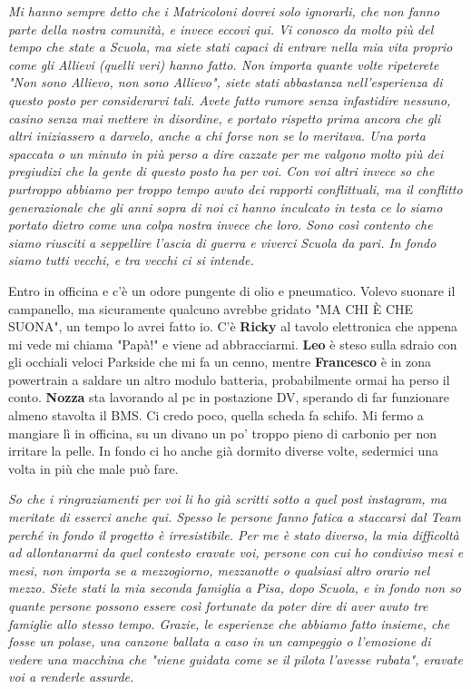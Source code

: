 \textit{Mi hanno sempre detto che i Matricoloni dovrei solo ignorarli, che non fanno parte della nostra comunità, e invece eccovi qui. Vi conosco da molto più del tempo che state a Scuola, ma siete stati capaci di entrare nella mia vita proprio come gli Allievi (quelli veri) hanno fatto. Non importa quante volte ripeterete "Non sono Allievo, non sono Allievo", siete stati abbastanza nell'esperienza di questo posto per considerarvi tali. Avete fatto rumore senza infastidire nessuno, casino senza mai mettere in disordine, e portato rispetto prima ancora che gli altri iniziassero a darvelo, anche a chi forse non se lo meritava. Una porta spaccata o un minuto in più perso a dire cazzate per me valgono molto più dei pregiudizi che la gente di questo posto ha per voi. Con voi altri invece so che purtroppo abbiamo per troppo tempo avuto dei rapporti conflittuali, ma il conflitto generazionale che gli anni sopra di noi ci hanno inculcato in testa ce lo siamo portato dietro come una colpa nostra invece che loro. Sono così contento che siamo riusciti a seppellire l'ascia di guerra e viverci Scuola da pari. In fondo siamo tutti vecchi, e tra vecchi ci si intende.}
\vspace{5mm}

Entro in officina e c'è un odore pungente di olio e pneumatico. Volevo suonare il campanello, ma sicuramente qualcuno avrebbe gridato "MA CHI È CHE SUONA", un tempo lo avrei fatto io. C'è \textbf{Ricky} al tavolo elettronica che appena mi vede mi chiama "Papà!" e viene ad abbracciarmi. \textbf{Leo} è steso sulla sdraio con gli occhiali veloci Parkside che mi fa un cenno, mentre \textbf{Francesco} è in zona powertrain a saldare un altro modulo batteria, probabilmente ormai ha perso il conto. \textbf{Nozza} sta lavorando al pc in postazione DV, sperando di far funzionare almeno stavolta il BMS. Ci credo poco, quella scheda fa schifo. Mi fermo a mangiare lì in officina, su un divano un po' troppo pieno di carbonio per non irritare la pelle. In fondo ci ho anche già dormito diverse volte, sedermici una volta in più che male può fare.
\vspace{5mm}

\textit{So che i ringraziamenti per voi li ho già scritti sotto a quel post instagram, ma meritate di esserci anche qui. Spesso le persone fanno fatica a staccarsi dal Team perché in fondo il progetto è irresistibile. Per me è stato diverso, la mia difficoltà ad allontanarmi da quel contesto eravate voi, persone con cui ho condiviso mesi e mesi, non importa se a mezzogiorno, mezzanotte o qualsiasi altro orario nel mezzo. Siete stati la mia seconda famiglia a Pisa, dopo Scuola, e in fondo non so quante persone possono essere così fortunate da poter dire di aver avuto tre famiglie allo stesso tempo. Grazie, le esperienze che abbiamo fatto insieme, che fosse un polase, una canzone ballata a caso in un campeggio o l'emozione di vedere una macchina che "viene guidata come se il pilota l'avesse rubata", eravate voi a renderle assurde.}
\vspace{1mm}

